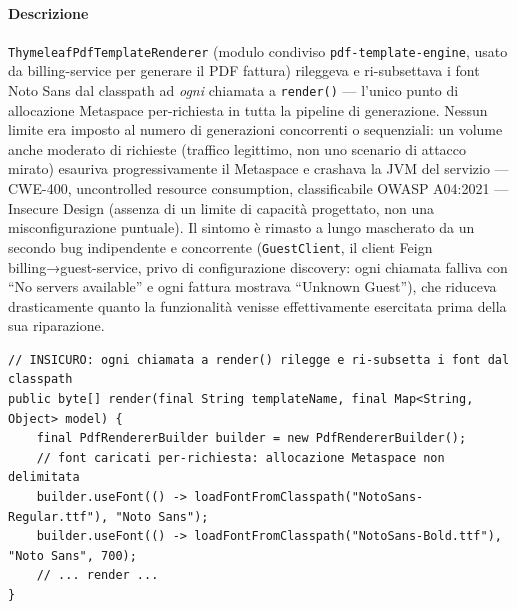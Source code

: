 ﻿\documentclass[a4paper,12pt]{report}
\begin{document}
\paragraph{Descrizione}
\texttt{ThymeleafPdfTemplateRenderer} (modulo condiviso \texttt{pdf-template-engine},
usato da billing-service per generare il PDF fattura) rileggeva e ri-subsettava i
font Noto Sans dal classpath ad \emph{ogni} chiamata a \texttt{render()} --- l'unico
punto di allocazione Metaspace per-richiesta in tutta la pipeline di generazione.
Nessun limite era imposto al numero di generazioni concorrenti o sequenziali: un
volume anche moderato di richieste (traffico legittimo, non uno scenario di attacco
mirato) esauriva progressivamente il Metaspace e crashava la JVM del servizio ---
CWE-400, uncontrolled resource consumption, classificabile OWASP A04:2021 ---
Insecure Design (assenza di un limite di capacità progettato, non una
misconfigurazione puntuale). Il sintomo è rimasto a lungo mascherato da un secondo
bug indipendente e concorrente (\texttt{GuestClient}, il client Feign
billing→guest-service, privo di configurazione discovery: ogni chiamata falliva
con ``No servers available'' e ogni fattura mostrava ``Unknown Guest''), che
riduceva drasticamente quanto la funzionalità venisse effettivamente esercitata
prima della sua riparazione.

\begin{insecurebox}[title={ThymeleafPdfTemplateRenderer.java --- font ricaricati ad ogni render() (baseline)}]
\begin{lstlisting}[style=java]
// INSICURO: ogni chiamata a render() rilegge e ri-subsetta i font dal classpath
public byte[] render(final String templateName, final Map<String, Object> model) {
    final PdfRendererBuilder builder = new PdfRendererBuilder();
    // font caricati per-richiesta: allocazione Metaspace non delimitata
    builder.useFont(() -> loadFontFromClasspath("NotoSans-Regular.ttf"), "Noto Sans");
    builder.useFont(() -> loadFontFromClasspath("NotoSans-Bold.ttf"), "Noto Sans", 700);
    // ... render ...
}
\end{lstlisting}
\end{insecurebox}
\end{document}

